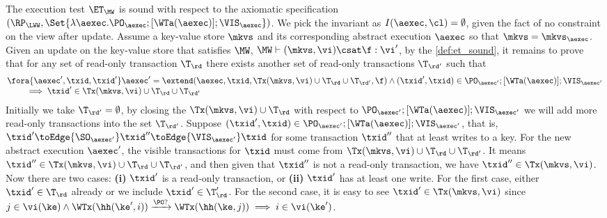 The execution test $\ET_\MW$ is sound with respect to the axiomatic specification 
{\color{blue}$(\RP_{\LWW}, \Set{\lambda \aexec. \PO_{\aexec} ; [\WTa(\aexec)] ; \VIS_{\aexec} })$}.
We pick the invariant as \( I( \aexec, \cl ) = \emptyset \), given the fact of no constraint on the view after update.
Assume a key-value store \( \mkvs \) and its corresponding abstract execution \( \aexec \) so that \( \mkvs = \mkvs_\aexec \).
Given an update on the key-value store that satisfies \( \MW \), \ie \( \MW \vdash (\mkvs, \vi) \csat \f : \vi' \),
by the \cref{def:et_sound}, it remains to prove that for any set of read-only transaction \( \T_{\rd} \) there exists another set of read-only transactions \( \T_{\rd'} \) such that
\[
    \begin{array}{@{}l@{}}
        \fora{ \aexec', \txid, \txid' } \aexec' = \extend(\aexec, \txid, \Tx(\mkvs, \vi) \cup \T_\rd \cup \T_{\rd'}, \f ) \land (\txid' ,\txid)  \in \PO_{\aexec'} ; [\WTa(\aexec)] ; \VIS_{\aexec'}  \\
    \qquad {} \implies \txid' \in \Tx(\mkvs, \vi) \cup \T_\rd \cup \T_{\rd'}
    \end{array}
\]
Initially we take \( \T_{\rd'} = \emptyset \), 
by closing the \( \Tx(\mkvs, \vi) \cup \T_\rd \) with respect to \( \PO_{\aexec'} ; [\WTa(\aexec)] ; \VIS_{\aexec'} \)
we will add more read-only transactions into the set \( \T_{\rd'}\).
Suppose \( (\txid' ,\txid)  \in \PO_{\aexec'} ; [\WTa(\aexec)] ; \VIS_{\aexec'} \), 
that is, \( \txid' \toEdge{\SO_{\aexec'}} \txid'' \toEdge{\VIS_{\aexec'}} \txid \) for some transaction \( \txid'' \) that at least writes to a key.
For the new abstract execution \( \aexec' \), the visible transactions for \( \txid \) must come from \( \Tx(\mkvs, \vi) \cup \T_\rd \cup \T_{\rd'} \).
It means \( \txid'' \in \Tx(\mkvs, \vi) \cup \T_\rd \cup \T_{\rd'} \),
and then given that \( \txid'' \) is not a read-only transaction, we have \( \txid'' \in \Tx(\mkvs, \vi) \).
Now there are two cases: \textbf{(i)} \( \txid' \) is a read-only transaction, or \textbf{(ii)} \( \txid' \) has at least one write.
For the first case, either \( \txid' \in \T_\rd \) already or we include \( \txid' \in \T'_{\rd} \).
For the second case, it is easy to see \( \txid' \in \Tx(\mkvs, \vi) \) since \( j \in \vi(\ke) \wedge \WTx(\hh(\ke', i)) \xrightarrow{\PO?} \WTx(\hh(\ke, j)) \implies i \in \vi(\ke') \).



